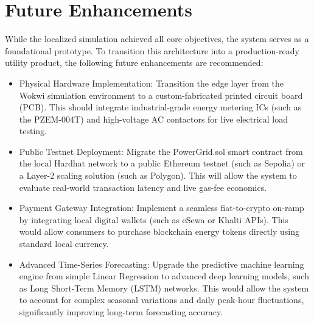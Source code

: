 \section{Future Enhancements}
While the localized simulation achieved all core objectives, the system serves as a foundational prototype. To transition this architecture into a production-ready utility product, the following future enhancements are recommended:
\begin{itemize}
    \item Physical Hardware Implementation: Transition the edge layer from the Wokwi simulation environment to a custom-fabricated printed circuit board (PCB). This should integrate industrial-grade energy metering ICs (such as the PZEM-004T) and high-voltage AC contactors for live electrical load testing.
    \item Public Testnet Deployment: Migrate the PowerGrid.sol smart contract from the local Hardhat network to a public Ethereum testnet (such as Sepolia) or a Layer-2 scaling solution (such as Polygon). This will allow the system to evaluate real-world transaction latency and live gas-fee economics.
    \item Payment Gateway Integration: Implement a seamless fiat-to-crypto on-ramp by integrating local digital wallets (such as eSewa or Khalti APIs). This would allow consumers to purchase blockchain energy tokens directly using standard local currency.
    \item Advanced Time-Series Forecasting: Upgrade the predictive machine learning engine from simple Linear Regression to advanced deep learning models, such as Long Short-Term Memory (LSTM) networks. This would allow the system to account for complex seasonal variations and daily peak-hour fluctuations, significantly improving long-term forecasting accuracy.
\end{itemize}